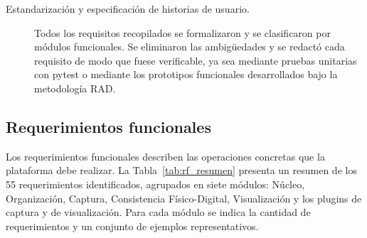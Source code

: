 \begin{description}
    \item[Estandarización y especificación de historias de usuario.] Todos los requisitos recopilados se formalizaron y se clasificaron por módulos funcionales. Se eliminaron las ambigüedades y se redactó cada requisito de modo que fuese verificable, ya sea mediante pruebas unitarias con pytest o mediante los prototipos funcionales desarrollados bajo la metodología RAD.
\end{description}

\subsection{Requerimientos funcionales}
 
Los requerimientos funcionales describen las operaciones concretas que la plataforma debe realizar. La Tabla~\ref{tab:rf_resumen} presenta un resumen de los 55 requerimientos identificados, agrupados en siete módulos: Núcleo, Organización, Captura, Consistencia Físico-Digital, Visualización y los plugins de captura y de visualización. Para cada módulo se indica la cantidad de requerimientos y un conjunto de ejemplos representativos.
 
